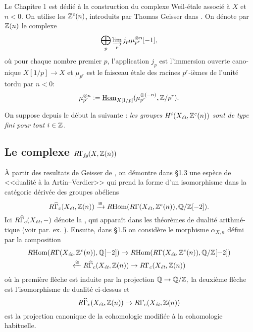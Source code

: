 \begin{otherlanguage}{french}
  Le Chapitre 1 est dédié à la construction du complexe Weil-étale associé à $X$
  et $n < 0$. On utilise les 
  $\mathbb{Z}^c (n)$, introduits par Thomas Geisser dans \cite{Geisser-10}. On dénote
  par $\mathbb{Z} (n)$ le complexe
  $$\bigoplus_p \varinjlim_r  j_{p!} \mu_{p^r}^{\otimes n} [-1],$$
  où pour chaque nombre premier $p$, l'application $j_p$ est l'immersion ouverte
  canonique $X [1/p] \to X$ et $\mu_{p^r}$ est le faisceau étale des racines
  $p^r$-ièmes de l'unité tordu par $n < 0$:
  $$\mu_{p^r}^{\otimes n} \mathrel{\mathop:}= \underline{\operatorname{Hom}}_{X[1/p]} (\mu_{p^r}^{\otimes (-n)}, \mathbb{Z}/p^r).$$

  On suppose depuis le début la suivante
  : \emph{les groupes
    $H^i (X_\text{\it ét}, \mathbb{Z}^c (n))$ sont de type fini pour tout $i\in \mathbb{Z}$}.

  \subsection*{Le complexe $R\Gamma_\text{\it fg} (X, \mathbb{Z} (n))$}

  À partir des resultats de Geisser de \cite{Geisser-10}, on démontre dans \S 1.3
  une espèce de <<dualité à la Artin--Verdier>> qui prend la forme d'un
  isomorphisme dans la catégorie dérivée des groupes abéliens
  \[ R\widehat{\Gamma}_c (X_\text{\it ét}, \mathbb{Z} (n)) \xrightarrow{\cong}
    R\!\operatorname{Hom} (R\Gamma (X_\text{\it ét}, \mathbb{Z}^c (n)), \mathbb{Q}/\mathbb{Z} [-2]). \]
  Ici $R\widehat{\Gamma}_c (X_\text{\it ét}, -)$ dénote la
  , qui apparaît dans les
  théorèmes de dualité arithmétique (voir par. ex. \cite{Milne-ADT}). Ensuite,
  dans \S 1.5 on considère le morphisme $\alpha_{X,n}$ défini par la composition
  \begin{multline*}
    R\!\operatorname{Hom} (R\Gamma (X_\text{\it ét}, \mathbb{Z}^c (n)), \mathbb{Q} [-2]) \to
    R\!\operatorname{Hom} (R\Gamma (X_\text{\it ét}, \mathbb{Z}^c (n)), \mathbb{Q}/\mathbb{Z}[-2]) \\
    \xleftarrow{\cong} R\widehat{\Gamma}_c (X_\text{\it ét}, \mathbb{Z} (n)) \to
    R\Gamma_c (X_\text{\it ét}, \mathbb{Z} (n))
  \end{multline*}
  où la première flèche est induite par la projection $\mathbb{Q} \to \mathbb{Q}/\mathbb{Z}$,
  la deuxième flèche est l'isomorphisme de dualité ci-dessus et
  \[ R\widehat{\Gamma}_c (X_\text{\it ét}, \mathbb{Z} (n)) \to
    R\Gamma_c (X_\text{\it ét}, \mathbb{Z} (n)) \]
  est la projection canonique de la cohomologie modifiée à la cohomologie
  habituelle.


\end{otherlanguage}
